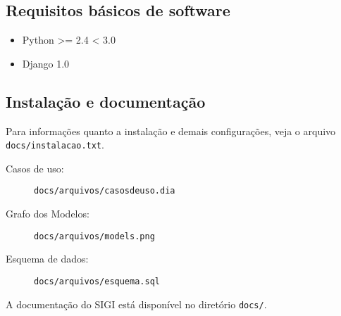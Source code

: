 
\hypertarget{requisitos-b-sicos-de-software}{}
\subsection*{Requisitos básicos de software}
\begin{itemize}
\item {} 
Python {\textgreater}= 2.4 {\textless} 3.0

\item {} 
Django 1.0

\end{itemize}



\hypertarget{instala-o-e-documenta-o}{}
\subsection*{Instalação e documentação}

Para informações quanto a instalação e demais configurações, veja o
arquivo \texttt{docs/instalacao.txt}.
\begin{description}
\item[{Casos de uso}:] %

\texttt{docs/arquivos/casosdeuso.dia}

\item[{Grafo dos Modelos}:] %

\texttt{docs/arquivos/models.png}

\item[{Esquema de dados}:] %

\texttt{docs/arquivos/esquema.sql}

\end{description}

A documentação do SIGI está disponível no diretório \texttt{docs/}.



